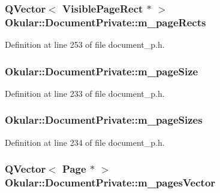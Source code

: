 \hypertarget{classOkular_1_1DocumentPrivate_a2d167614d4dc602ada64ab925cee6dce}{
\subsubsection[{m\+\_\+page\+Rects}]{\setlength{\rightskip}{0pt plus 5cm}Q\+Vector$<$ {\bf Visible\+Page\+Rect} $\ast$ $>$ Okular\+::\+Document\+Private\+::m\+\_\+page\+Rects}}\label{classOkular_1_1DocumentPrivate_a2d167614d4dc602ada64ab925cee6dce}


Definition at line 253 of file document\+\_\+p.\+h.

\hypertarget{classOkular_1_1DocumentPrivate_a6c09eaaed5a1d862bb11074347cc102d}{
\subsubsection[{m\+\_\+page\+Size}]{ Okular\+::\+Document\+Private\+::m\+\_\+page\+Size}}\label{classOkular_1_1DocumentPrivate_a6c09eaaed5a1d862bb11074347cc102d}


Definition at line 233 of file document\+\_\+p.\+h.

\hypertarget{classOkular_1_1DocumentPrivate_a71f8c84e54d8cc8a5f3396f18c7dae7a}{
\subsubsection[{m\+\_\+page\+Sizes}]{ Okular\+::\+Document\+Private\+::m\+\_\+page\+Sizes}}\label{classOkular_1_1DocumentPrivate_a71f8c84e54d8cc8a5f3396f18c7dae7a}


Definition at line 234 of file document\+\_\+p.\+h.

\hypertarget{classOkular_1_1DocumentPrivate_a73b852d9a73ffe8061b66dbf9b290f17}{
\subsubsection[{m\+\_\+pages\+Vector}]{\setlength{\rightskip}{0pt plus 5cm}Q\+Vector$<$ {\bf Page} $\ast$ $>$ Okular\+::\+Document\+Private\+::m\+\_\+pages\+Vector}}\label{classOkular_1_1DocumentPrivate_a73b852d9a73ffe8061b66dbf9b290f17}


